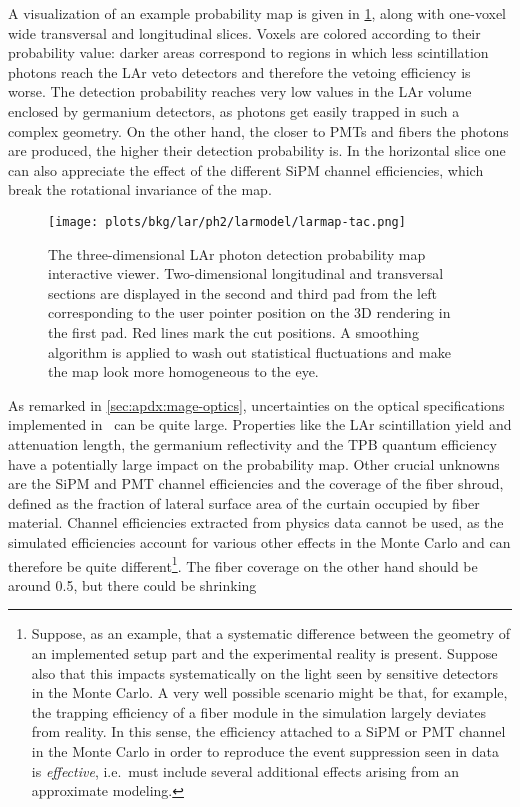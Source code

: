 A visualization of an example probability map is given in
\cref{fig:bkg:lar:ph2:larmap:tac}, along with one-voxel wide transversal and longitudinal
slices. Voxels are colored according to their probability value: darker areas correspond
to regions in which less scintillation photons reach the LAr veto detectors and therefore
the vetoing efficiency is worse. The detection probability reaches very low values in the
LAr volume enclosed by germanium detectors, as photons get easily trapped in such a
complex geometry. On the other hand, the closer to PMTs and fibers the photons are
produced, the higher their detection probability is. In the horizontal slice one can also
appreciate the effect of the different SiPM channel efficiencies, which break the
rotational invariance of the map.
\newpar
\begin{figure}
  \centering
  \texttt{[image: plots/bkg/lar/ph2/larmodel/larmap-tac.png]}
  \caption{%
    The three-dimensional LAr photon detection probability map interactive viewer.
    Two-dimensional longitudinal and transversal sections are displayed in the second and
    third pad from the left corresponding to the user pointer position on the 3D
    rendering in the first pad. Red lines mark the cut positions. A smoothing algorithm is
    applied to wash out statistical fluctuations and make the map look more homogeneous to
    the eye.
  }\label{fig:bkg:lar:ph2:larmap:tac}
\end{figure}
As remarked in \cref{sec:apdx:mage-optics}, uncertainties on the optical specifications
implemented in \mage\ can be quite large. Properties like the LAr scintillation yield and
attenuation length, the germanium reflectivity and the TPB quantum efficiency have a
potentially large impact on the probability map. Other crucial unknowns are the SiPM and PMT
channel efficiencies and the coverage of the fiber shroud, defined as the fraction of
lateral surface area of the curtain occupied by fiber material. Channel efficiencies
extracted from physics data cannot be used, as the simulated efficiencies account for
various other effects in the Monte Carlo and can therefore be quite
different\footnote{\label{footnote:bkg:lar:ph2:mc-eff}%
  Suppose, as an example, that a systematic difference between the geometry of an
  implemented setup part and the experimental reality is present. Suppose also that this
  impacts systematically on the light seen by sensitive detectors in the Monte Carlo. A
  very well possible scenario might be that, for example, the trapping efficiency of a
  fiber module in the simulation largely deviates from reality. In this sense, the
  efficiency attached to a SiPM or PMT channel in the Monte Carlo in order to reproduce
  the event suppression seen in data is \emph{effective}, i.e.~must include several
  additional effects arising from an approximate modeling.
}. The fiber coverage on the other hand should be around 0.5, but there could be shrinking
